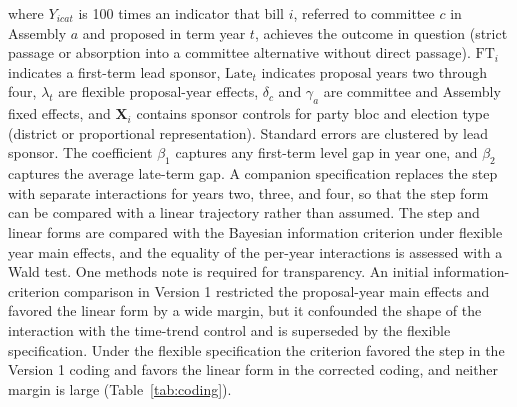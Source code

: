 \documentclass[11pt]{article}
\begin{document}
where $Y_{icat}$ is 100 times an indicator that bill $i$, referred to committee $c$ in Assembly $a$ and proposed in term year $t$, achieves the outcome in question (strict passage or absorption into a committee alternative without direct passage). $\text{FT}_i$ indicates a first-term lead sponsor, $\text{Late}_t$ indicates proposal years two through four, $\lambda_t$ are flexible proposal-year effects, $\delta_c$ and $\gamma_a$ are committee and Assembly fixed effects, and $\mathbf{X}_i$ contains sponsor controls for party bloc and election type (district or proportional representation). Standard errors are clustered by lead sponsor. The coefficient $\beta_1$ captures any first-term level gap in year one, and $\beta_2$ captures the average late-term gap. A companion specification replaces the step with separate interactions for years two, three, and four, so that the step form can be compared with a linear trajectory rather than assumed. The step and linear forms are compared with the Bayesian information criterion under flexible year main effects, and the equality of the per-year interactions is assessed with a Wald test. One methods note is required for transparency. An initial information-criterion comparison in Version 1 restricted the proposal-year main effects and favored the linear form by a wide margin, but it confounded the shape of the interaction with the time-trend control and is superseded by the flexible specification. Under the flexible specification the criterion favored the step in the Version 1 coding and favors the linear form in the corrected coding, and neither margin is large (Table~\ref{tab:coding}).
\end{document}
